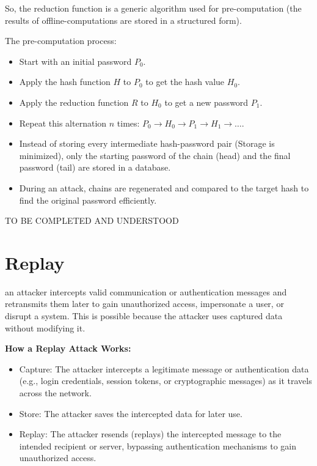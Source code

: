 So, the reduction function is a generic algorithm used for pre-computation  (the results of offline-computations are stored in a structured form). 

The pre-computation process:
\begin{itemize}
    \item Start with an initial password  $P_0$.
    \item Apply the hash function $H$  to  $P_0$  to get the hash value  $H_0$.
    \item Apply the reduction function  $R$  to  $H_0$  to get a new password  $P_1$.
    \item Repeat this alternation  $n$  times:  $P_0 \rightarrow H_0 \rightarrow P_1 \rightarrow H_1 \rightarrow \dots$.
    \item Instead of storing every intermediate hash-password pair (Storage is minimized), only the starting password of the chain (head) and the final password (tail) are stored in a database.
    \item During an attack, chains are regenerated and compared to the target hash to find the original password efficiently.
\end{itemize}


{\LARGE{TO BE COMPLETED AND UNDERSTOOD}}


\centering
\section{Replay}
\raggedright
an attacker intercepts valid communication or authentication messages and retransmits them later to gain unauthorized access, impersonate a user, or disrupt a system. This is possible because the attacker uses captured data without modifying it.

\textbf{How a Replay Attack Works:}
\begin{itemize}
    \item Capture: The attacker intercepts a legitimate message or authentication data (e.g., login credentials, session tokens, or cryptographic messages) as it travels across the network.
    \item Store: The attacker saves the intercepted data for later use.
    \item Replay: The attacker resends (replays) the intercepted message to the intended recipient or server, bypassing authentication mechanisms to gain unauthorized access.
\end{itemize}


